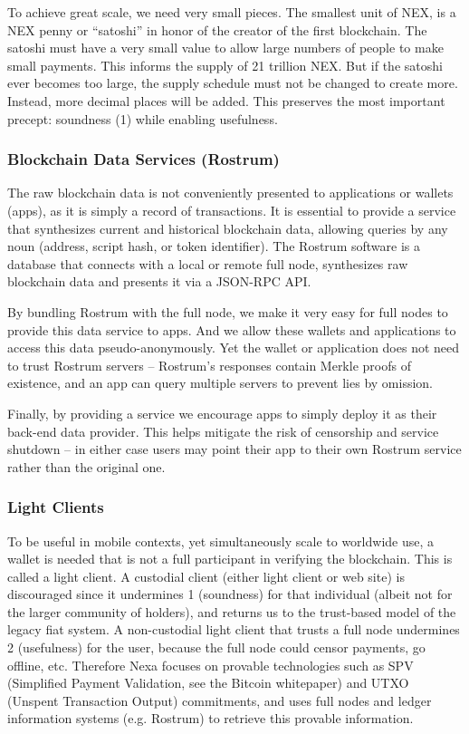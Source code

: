 \documentclass[a4paper, 11pt]{article}
\begin{document}
	To achieve great scale, we need very small pieces.  The smallest unit of NEX, is a NEX penny or “satoshi” in honor of the creator of the first blockchain.  The satoshi must have a very small value to allow large numbers of people to make small payments.  This informs the supply of 21 trillion NEX.  But if the satoshi ever becomes too large, the supply schedule must not be changed to create more.  Instead, more decimal places will be added.  This preserves the most important precept: soundness (1) while enabling usefulness.

\subsubsection{Blockchain Data Services (Rostrum)}
The raw blockchain data is not conveniently presented to applications or wallets (apps), as it is simply a record of transactions.  It is essential to provide a service that synthesizes current and historical blockchain data, allowing queries by any noun (address, script hash, or token identifier).  The Rostrum software is a database that connects with a local or remote full node, synthesizes raw blockchain data and presents it via a JSON-RPC API.

By bundling Rostrum with the full node, we make it very easy for full nodes to provide this data service to apps.  And we allow these wallets and applications to access this data pseudo-anonymously.  Yet the wallet or application does not need to trust Rostrum servers – Rostrum’s responses contain Merkle proofs of existence, and an app can query multiple servers to prevent lies by omission.

Finally, by providing a service we encourage apps to simply deploy it as their back-end data provider.  This helps mitigate the risk of censorship and service shutdown – in either case users may point their app to their own Rostrum service rather than the original one.

\subsubsection{Light Clients}
To be useful in mobile contexts, yet simultaneously scale to worldwide use, a wallet is needed that is not a full participant in verifying the blockchain.  This is called a light client.  A custodial client (either light client or web site) is discouraged since it undermines 1 (soundness) for that individual (albeit not for the larger community of holders), and returns us to the trust-based model of the legacy fiat system.  A non-custodial light client that trusts a full node undermines 2 (usefulness) for the user, because the full node could censor payments, go offline, etc.  Therefore Nexa focuses on provable technologies such as SPV (Simplified Payment Validation, see the Bitcoin whitepaper) and UTXO (Unspent Transaction Output) commitments, and uses full nodes and ledger information systems (e.g. Rostrum) to retrieve this provable information.
\end{document}
